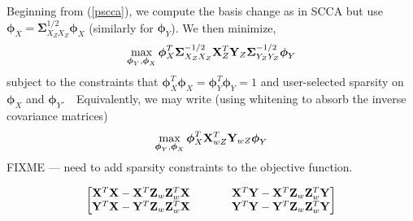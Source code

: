 \documentclass{llncs}
\newcommand{\X}{{\bf X}}
\newcommand{\Y}{{\bf Y}}
\newcommand{\Z}{{\bf Z}}
\newcommand{\bs}{\boldsymbol}
\newcommand{\bSigma}{\boldsymbol \Sigma}
\begin{document}
Beginning from (\ref{pscca}), we compute the basis change as in SCCA but use $\bs\phi_X=\bSigma^{1/2}_{X_ZX_Z}\bs\phi_X$
(similarly for $\bs\phi_Y$).  We then minimize,
\begin{eqnarray}
\label{pscca2}
\max_{{\bs\phi_Y}, {\bs\phi_X}} \bs\phi_X^T \bSigma^{-1/2}_{X_ZX_Z} \X_Z^T \Y_Z \bSigma^{-1/2}_{Y_ZY_Z}\bs\phi_Y 
\end{eqnarray}
subject to the constraints that $\bs\phi_X^T \bs\phi_X 
=  \bs\phi_Y^T \bs\phi_Y = 1$ and user-selected sparsity on 
$\bs\phi_X$ and $\bs\phi_Y$.~~Equivalently, we may write (using
whitening to absorb the inverse covariance matrices)
\begin{eqnarray}
\label{pscca3}
\max_{{\bs\phi_Y}, {\bs\phi_X}} \bs\phi_X^T \X_{wZ}^T \Y_{wZ} \bs\phi_Y 
\end{eqnarray}
FIXME --- need to add sparsity constraints to the objective function.

\begin{eqnarray}
\label{matrices}
\begin{bmatrix}
\X^T \X - \X^T \Z_w \Z_w^T \X  ~~~~&~~~~   \X^T \Y - \X^T \Z_w \Z_w^T \Y  \\
\Y^T \X - \Y^T \Z_w \Z_w^T \X   ~~~~&~~~~  \Y^T \Y- \Y^T \Z_w \Z_w^T \Y 
\end{bmatrix}
\end{eqnarray}




\end{document}
